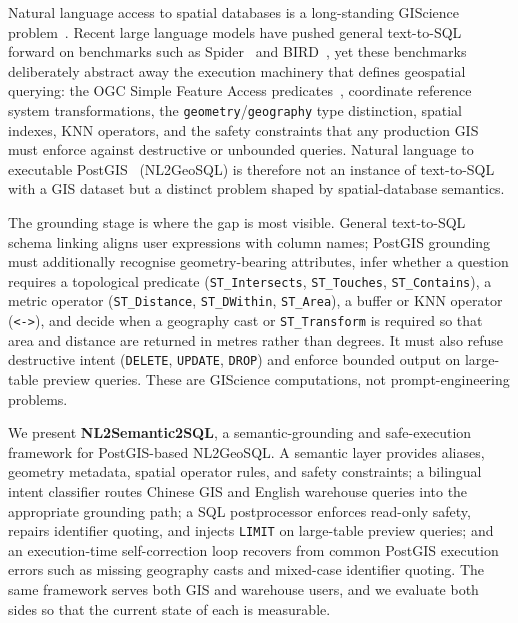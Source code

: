 \documentclass[11pt]{article}
\begin{document}
Natural language access to spatial databases is a long-standing GIScience problem~\citep{goodchild1992gis,egenhofer1991topological,clementini1993small}. Recent large language models have pushed general text-to-SQL forward on benchmarks such as Spider~\citep{yu2018spider} and BIRD~\citep{li2023bird}, yet these benchmarks deliberately abstract away the execution machinery that defines geospatial querying: the OGC Simple Feature Access predicates~\citep{ogcsfs}, coordinate reference system transformations, the \texttt{geometry}/\texttt{geography} type distinction, spatial indexes, KNN operators, and the safety constraints that any production GIS must enforce against destructive or unbounded queries. Natural language to executable PostGIS~\citep{postgis} (NL2GeoSQL) is therefore not an instance of text-to-SQL with a GIS dataset but a distinct problem shaped by spatial-database semantics.

The grounding stage is where the gap is most visible. General text-to-SQL schema linking aligns user expressions with column names; PostGIS grounding must additionally recognise geometry-bearing attributes, infer whether a question requires a topological predicate (\texttt{ST\_Intersects}, \texttt{ST\_Touches}, \texttt{ST\_Contains}), a metric operator (\texttt{ST\_Distance}, \texttt{ST\_DWithin}, \texttt{ST\_Area}), a buffer or KNN operator (\texttt{<->}), and decide when a geography cast or \texttt{ST\_Transform} is required so that area and distance are returned in metres rather than degrees. It must also refuse destructive intent (\texttt{DELETE}, \texttt{UPDATE}, \texttt{DROP}) and enforce bounded output on large-table preview queries. These are GIScience computations, not prompt-engineering problems.

We present \textbf{NL2Semantic2SQL}, a semantic-grounding and safe-execution framework for PostGIS-based NL2GeoSQL. A semantic layer provides aliases, geometry metadata, spatial operator rules, and safety constraints; a bilingual intent classifier routes Chinese GIS and English warehouse queries into the appropriate grounding path; a SQL postprocessor enforces read-only safety, repairs identifier quoting, and injects \texttt{LIMIT} on large-table preview queries; and an execution-time self-correction loop recovers from common PostGIS execution errors such as missing geography casts and mixed-case identifier quoting. The same framework serves both GIS and warehouse users, and we evaluate both sides so that the current state of each is measurable.
\end{document}
